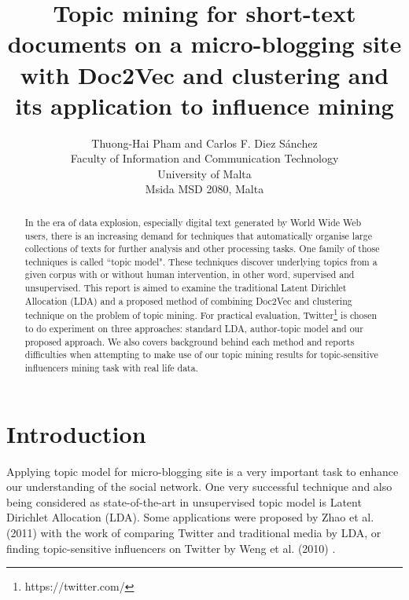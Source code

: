 \documentclass[11pt]{article}
\begin{document}
\title{Topic mining for short-text documents on a micro-blogging site with Doc2Vec and clustering and its application to influence mining}


\author{Thuong-Hai Pham and Carlos F. Diez Sánchez\\
Faculty of Information and Communication Technology\\
University of Malta\\
Msida MSD 2080, Malta}

\maketitle

\begin{abstract}
In the era of data explosion, especially digital text generated by World Wide Web users, there is an increasing demand for techniques that automatically organise large collections of texts for further analysis and other processing tasks. One family of those techniques is called ``topic model". These techniques discover underlying topics from a given corpus with or without human intervention, in other word, supervised and unsupervised. This report is aimed to examine the traditional Latent Dirichlet Allocation (LDA) and a proposed method of combining Doc2Vec and clustering technique on the problem of topic mining. For practical evaluation, Twitter\footnote{https://twitter.com/} is chosen to do experiment on three approaches: standard LDA, author-topic model and our proposed approach. We also covers background behind each method and reports difficulties when attempting to make use of our topic mining results for topic-sensitive influencers mining task with real life data.
\end{abstract}


\section{Introduction}

Applying topic model for micro-blogging site is a very important task to enhance our understanding of the social network. One very successful technique and also being considered as state-of-the-art in unsupervised topic model is Latent Dirichlet Allocation (LDA)\cite{Blei2003}. Some applications were proposed by Zhao et al. (2011) \cite{zhao2011comparing} with the work of comparing Twitter and traditional media by LDA, or finding topic-sensitive influencers on Twitter by Weng et al. (2010) \cite{Weng2010}.
\end{document}
